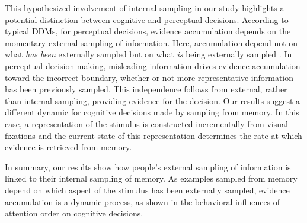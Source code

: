 \documentclass[man,floatsintext]{apa6}
\begin{document}
This hypothesized involvement of internal sampling in our study highlights a potential distinction
between cognitive and perceptual decisions. According to typical DDMs,  for perceptual decisions,
evidence accumulation depends on the momentary external sampling of information. Here, accumulation
depend not on what \textit{has been} externally sampled but on what \textit{is} being externally
sampled \parencite[e.g.,][]{Gold2001a}. In perceptual decision making, misleading information drives
evidence accumulation toward the incorrect boundary, whether or not more representative information
has been previously sampled.  This independence follows from external, rather than internal
sampling, providing evidence for the decision. Our results suggest a different dynamic for cognitive
decisions made by sampling from memory. In this case, a representation of the stimulus is constructed
incrementally from visual fixations and the current state of this representation determines the rate
at which evidence is retrieved from memory.

In summary, our results show how people's external sampling of information is linked to
their internal sampling of memory. As examples sampled from memory depend on which aspect of the
stimulus has been externally sampled, evidence accumulation is a dynamic process, as shown in the
behavioral influences of attention order on cognitive decisions.


\printbibliography{}
\end{document}
